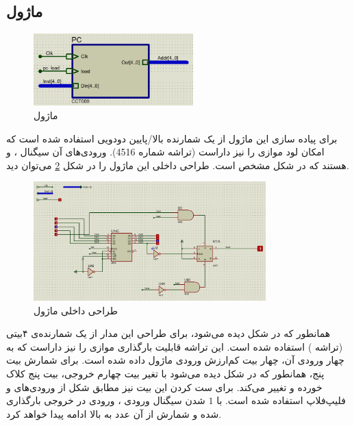 \documentclass[12pt,onecolumn,a4paper,fleqn]{article}
\begin{document}
\subsection{ماژول }
\begin{figure}[H]
	\centering
	\includegraphics[width=0.55\textwidth]{source/pc_interface.png}
	\caption{ماژول }
	\label{fig:3}
\end{figure}
برای پیاده سازی این ماژول از یک شمارنده بالا/پایین دودویی استفاده شده است که امکان لود موازی را نیز داراست (تراشه شماره 4516). ورودی‌های آن سیگنال
،
و
هستند که در شکل مشخص است. طراحی داخلی این ماژول را در شکل \ref{fig:pc-inner} می‌توان دید.
\begin{figure}[H]
	\centering
	\includegraphics[width=0.8\textwidth]{source/pc_inner.png}
	\caption{طراحی داخلی ماژول }
	\label{fig:pc-inner}
\end{figure}
همانطور که در شکل دیده می‌شود، برای طراحی این مدار از یک شمارنده‌ی ۴بیتی (تراشه ‌) استفاده شده است. این تراشه قابلیت بارگذاری موازی را نیز داراست که به چهار ورودی آن، چهار بیت کم‌ارزش ورودی ماژول داده شده است. برای شمارش بیت پنج، همانطور که در شکل دیده می‌شود با تغیر بیت چهارم خروجی، بیت پنج کلاک خورده و تغییر می‌کند. برای ست کردن این بیت نیز مطابق شکل از ورودی‌های  و  فلیپ‌فلاپ استفاده شده است. با $1$ شدن سیگنال ورودی ، ورودی در خروجی بارگذاری شده و شمارش از آن عدد به بالا ادامه پیدا خواهد کرد.
\end{document}
